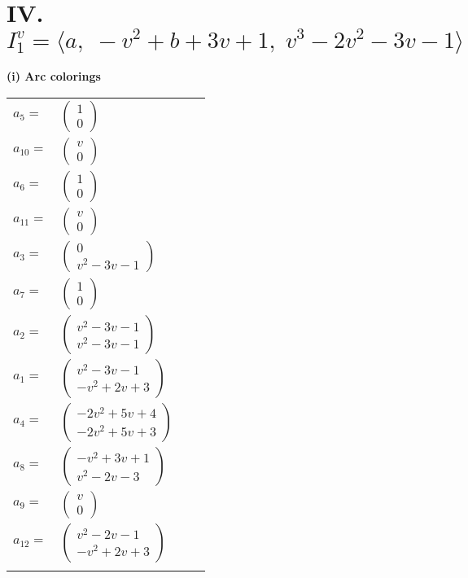 \documentclass[1p]{elsarticle_modified}
\theoremstyle{definition}
\begin{document}
\centering \section*{IV. $I^v_{1}= \langle a,\;- v^2+b+3 v+1,\;v^3-2 v^2-3 v-1 \rangle$}
\flushleft \textbf{(i) Arc colorings}\\
\begin{tabular}{m{7pt} m{180pt} m{7pt} m{180pt} }
\flushright $a_{5}=$&$\begin{pmatrix}1\\0\end{pmatrix}$ \\
\flushright $a_{10}=$&$\begin{pmatrix}v\\0\end{pmatrix}$ \\
\flushright $a_{6}=$&$\begin{pmatrix}1\\0\end{pmatrix}$ \\
\flushright $a_{11}=$&$\begin{pmatrix}v\\0\end{pmatrix}$ \\
\flushright $a_{3}=$&$\begin{pmatrix}0\\v^2-3 v-1\end{pmatrix}$ \\
\flushright $a_{7}=$&$\begin{pmatrix}1\\0\end{pmatrix}$ \\
\flushright $a_{2}=$&$\begin{pmatrix}v^2-3 v-1\\v^2-3 v-1\end{pmatrix}$ \\
\flushright $a_{1}=$&$\begin{pmatrix}v^2-3 v-1\\- v^2+2 v+3\end{pmatrix}$ \\
\flushright $a_{4}=$&$\begin{pmatrix}-2 v^2+5 v+4\\-2 v^2+5 v+3\end{pmatrix}$ \\
\flushright $a_{8}=$&$\begin{pmatrix}- v^2+3 v+1\\v^2-2 v-3\end{pmatrix}$ \\
\flushright $a_{9}=$&$\begin{pmatrix}v\\0\end{pmatrix}$ \\
\flushright $a_{12}=$&$\begin{pmatrix}v^2-2 v-1\\- v^2+2 v+3\end{pmatrix}$\\&\end{tabular}
\end{document}
